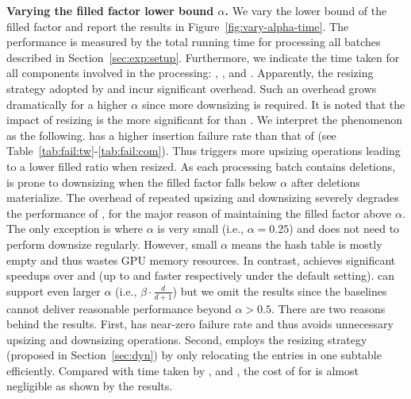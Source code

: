 \vspace{1mm}\noindent\textbf{Varying the filled factor lower bound $\alpha$.}
We vary the lower bound of the filled factor and report the results in Figure~\ref{fig:vary-alpha-time}. 
The performance is measured by the total running time for processing all batches described in Section~\ref{sec:exp:setup}. Furthermore, we indicate the time taken for all components involved in the processing: , ,  and . Apparently, the resizing strategy adopted by \linear and \megakv incur significant overhead. Such an overhead grows dramatically for a higher $\alpha$ since more downsizing is required. It is noted that the impact of resizing is the more significant for \megakv than \linear. We interpret the phenomenon as the following.
\megakv has a higher insertion failure rate than that of \linear (see Table~\ref{tab:fail:tw}-\ref{tab:fail:com}). Thus \megakv triggers more upsizing operations leading to a lower filled ratio when resized. As each processing batch contains deletions, \megakv is prone to downsizing when the filled factor falls below $\alpha$ after deletions materialize.
The overhead of repeated upsizing and downsizing severely degrades the performance of \megakv, for the major reason of maintaining the filled factor above $\alpha$. 
The only exception is where $\alpha$ is very small (i.e., $\alpha=0.25$) and \megakv does not need to perform downsize regularly. However, small $\alpha$ means the hash table is mostly empty and thus wastes GPU memory resources.
In contrast, \voter achieves significant speedups over \linear and \megakv (up to \xxx and \xxx faster respectively under the default setting). 
\voter can support even larger $\alpha$ (i.e., $\beta\cdot\frac{d}{d+1}$) but we omit the results since the baselines cannot deliver reasonable performance beyond $\alpha > 0.5$.
There are two reasons behind the results. First, \voter has near-zero failure rate and thus avoids unnecessary upsizing and downsizing operations. Second, \voter employs the resizing strategy (proposed in Section~\ref{sec:dyn}) by only relocating the entries in one subtable efficiently. 
Compared with time taken by ,  and , the cost of  for \voter is almost negligible as shown by the results. 



